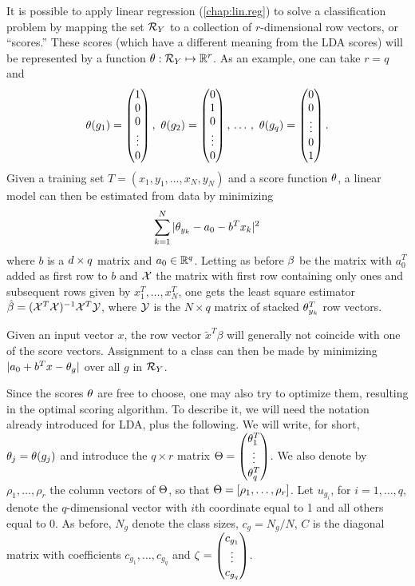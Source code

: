 It is possible to apply linear regression (\cref{chap:lin.reg}) to solve a classification problem by mapping  the set ${\mathcal R}_Y$ to a collection of $r$-dimensional row vectors, or ``scores.''  These scores (which have a different meaning from the LDA scores) will be represented by a function $\theta : {\mathcal R}_Y \mapsto {\mathbb{R}}^r$. As an example, one can  take $r=q$ and 
\[
\th(g_1) = \begin{pmatrix} 1\\ 0\\0\\ \vdots\\0\end{pmatrix},\ 
\th(g_2) = \begin{pmatrix} 0\\ 1\\0\\ \vdots\\0\end{pmatrix},\,\ldots\,, \ 
\th(g_q) = \begin{pmatrix} 0\\ 0\\ \vdots\\0\\1\end{pmatrix}.
\]
Given a training set $T = (x_1, y_1, \ldots, x_N, y_N)$ and a score function $\theta$, a linear
model can then be estimated from  data by minimizing
$$
\sum_{k=1}^N |\theta_{y_k} - {a_0} - b^T  x_k|^2
$$ 
where $b$ is a $d \times
q$ matrix and ${a_0} \in {\mathbb{R}}^q$. Letting as before $\beta$ be the matrix with $a_0^T$ added as first row to $b$ and ${\mathcal X}$ the matrix with first row containing only ones and subsequent rows given by $x_1^T, \ldots, x_N^T$, one gets the least square estimator
$\hat \beta = ({\mathcal X}^T{\mathcal X})^{-1}{\mathcal X}^T{\mathcal Y}$, where ${\mathcal Y}$ is the $N\times q$
matrix of stacked $\theta^T_{y_k}$ row vectors. 

Given an input vector $x$, the row vector $\tilde x^T\beta$ will generally not coincide with one of the score vectors.  Assignment to a class can   then be
made by minimizing $|{a_0} + b^T x - \theta_{g}|$ over all
$g$ in ${\mathcal R}_Y$.\bigskip


Since the scores $\theta$ are free to choose, one may also try to optimize them, resulting in the \alert{optimal scoring} algorithm. To describe it, we will need the notation already introduced for LDA, plus the following.  We will write, for short,  $\theta_j = \theta(g_j)$ and introduce the $q\times r$ matrix $\Theta = \begin{pmatrix} \theta_1^T\\ \vdots\\ \theta_q^T\end{pmatrix}$.
We also denote by  $\rho_1, \ldots, \rho_r$ the column vectors of $\Theta$, so that $\Theta = [\rho_1, \ldots, \rho_r]$. 
Let $u_{g_i}$, for $i=1, \ldots, q$, denote the $q$-dimensional vector with $i$th coordinate equal to 1 and all others equal to 0.
As before, $N_g$ denote the class sizes,  $c_g = N_g/N$, $C$ is the diagonal matrix with coefficients $c_{g_1}, \ldots, c_{g_q}$ and $\zeta = \begin{pmatrix} c_{g_1}\\ \vdots \\c_{g_q}\end{pmatrix}$.

